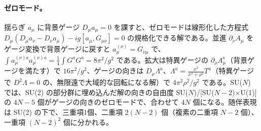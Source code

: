 \documentclass[a4paper,10pt]{ltjsarticle}
\begin{document}
\paragraph{ゼロモード。}揺らぎ $a_\mu$ に背景ゲージ $D_\mu a_\mu=0$ を課すと、ゼロモードは線形化した方程式 $D_\mu(D_\mu a_\nu-D_\nu a_\mu)-ig[a_\mu,G_{\mu\nu}]=0$ の規格化できる解である。並進 $\partial_\nu A_\mu$ をゲージ変換で背景ゲージに戻すと $a^{(\nu)}_\mu=G_{\nu\mu}$ で、$\int a^{(\nu)a}_\mu a^{(\nu)a}_\mu=\frac14\int G^aG^a=8\pi^2/g^2$ である。拡大は特異ゲージの $\partial_\rho A^{\mathrm s}_\mu$（背景ゲージを満たす）で $16\pi^2/g^2$、ゲージの向きは $D_\mu\Lambda^a$、$\Lambda^a=\frac{x^2}{x^2+\rho^2}T^a$（特異ゲージで $D^2\Lambda=0$ の、無限遠で大域的な回転になる解）で $4\pi^2\rho^2/g^2$ である。SU($N$) では、SU(2) の部分群に埋め込んだ解の向きの自由度 SU($N$)/[SU($N-2$)$\times$U(1)] の $4N-5$ 個がゲージの向きのゼロモードで、合わせて $4N$ 個になる。随伴表現は SU(2) の下で、三重項1個、二重項 $2(N-2)$ 個（複素の二重項 $N-2$ 個）、一重項 $(N-2)^2$ 個に分かれる。
\end{document}
